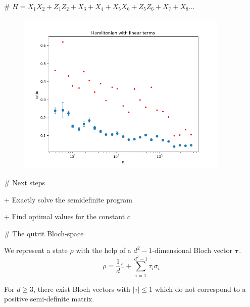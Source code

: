 # $H =  X_1X_{2}+Z_1Z_{2}+X_{3}+X_{4}+X_5X_{6}+Z_5Z_{6}+X_{7}+X_{8}\ldots$

\begin{figure}[h]
	\centering
	\includegraphics[width=0.9\textwidth]{avgplot(4,5200,2,20,25}
	\label{fig:3}
\end{figure}

# Next steps

+ Exactly solve the semidefinite program

+ Find optimal values for the constant $c$


# The qutrit Bloch-space

We represent a state $\rho$ with the help of a $d^2-1$-dimensional Bloch vector $\bm{\tau}$.
$$\rho = \frac{1}{d} \mathds{1} + \sum_{i=1}^{d^2-1} \tau_i \sigma_i$$

For $d\ge3$, there exist Bloch vectors with $\left|\tau\right|\le 1$ which do not correspond to a positive semi-definite matrix.


